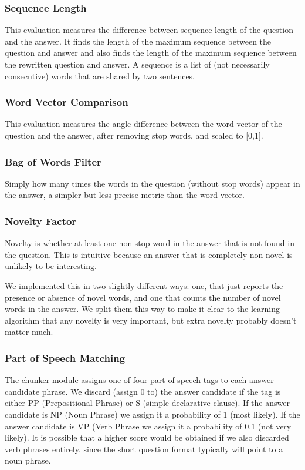 \documentclass{article}
\begin{document}
\subsubsection{Sequence Length}
This evaluation measures the difference between sequence length of the question
and the answer. It finds the length of the maximum sequence between the question
and answer and also finds the length of the maximum sequence between the
rewritten question and answer. A sequence is a list of (not necessarily
consecutive) words that are shared by two sentences.

\subsubsection{Word Vector Comparison}

This evaluation measures the angle difference between the word vector of the
question and the answer, after removing stop words, and scaled to [0,1].

\subsubsection{Bag of Words Filter}

Simply how many times the words in the question (without stop words) appear in
the answer, a simpler but less precise metric than the word vector.

\subsubsection{Novelty Factor}

Novelty is whether at least one non-stop word in the answer that is not found in
the question.  This is intuitive because an answer that is completely non-novel
is unlikely to be interesting.

We implemented this in two slightly different ways:  one, that just reports the
presence or absence of novel words, and one that counts the number of novel
words in the answer.  We split them this way to make it clear to the learning
algorithm that any novelty is very important, but extra novelty probably doesn't
matter much.

\subsubsection{Part of Speech Matching}
The chunker module assigns one of four part of speech tags to each answer
candidate phrase. We discard (assign 0 to) the answer candidate if the tag is
either PP (Prepositional Phrase) or S (simple declarative clause). If the answer
candidate is NP (Noun Phrase) we assign it a probability of 1 (most likely). If
the answer candidate is VP (Verb Phrase we assign it a probability of 0.1 (not
very likely). It is possible that a higher score would be obtained if we also
discarded verb phrases entirely, since the short question format typically
will point to a noun phrase.
\end{document}
